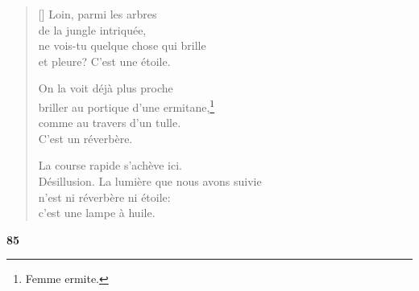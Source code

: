 \begin{verse}[\versewidth]
  Loin, parmi les arbres \\
  de la jungle intriquée, \\
  ne vois-tu quelque chose qui brille \\
  et pleure? C'est une étoile.

  On la voit déjà plus proche \\
  briller au portique d'une ermitane,\footnote{Femme ermite.} \\
  comme au travers d'un tulle. \\
  C'est un réverbère.

  La course rapide s'achève ici. \\
  Désillusion. La lumière que nous avons suivie \\
  n'est ni réverbère ni étoile: \\
  c'est une lampe à huile.
\end{verse}

\bigskip

\begin{center}
  \textbf{85}
\end{center}

\settowidth{\versewidth}{celui qui est arc-en-ciel de calme dans les tempêtes.}


